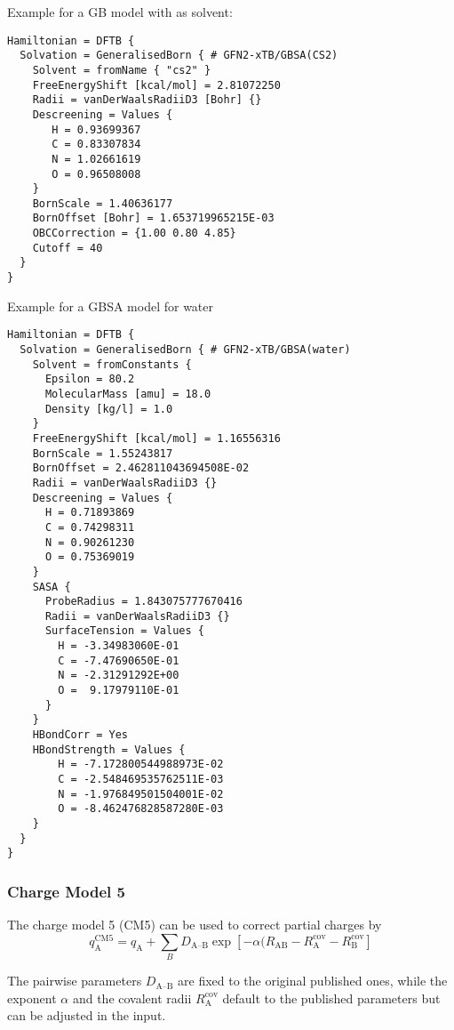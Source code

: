 Example for a GB model with  as solvent:

\begin{verbatim}
Hamiltonian = DFTB {
  Solvation = GeneralisedBorn { # GFN2-xTB/GBSA(CS2)
    Solvent = fromName { "cs2" }
    FreeEnergyShift [kcal/mol] = 2.81072250
    Radii = vanDerWaalsRadiiD3 [Bohr] {}
    Descreening = Values {
       H = 0.93699367
       C = 0.83307834
       N = 1.02661619
       O = 0.96508008
    }
    BornScale = 1.40636177
    BornOffset [Bohr] = 1.653719965215E-03
    OBCCorrection = {1.00 0.80 4.85}
    Cutoff = 40
  }
}
\end{verbatim}

Example for a GBSA model for water

\begin{verbatim}
Hamiltonian = DFTB {
  Solvation = GeneralisedBorn { # GFN2-xTB/GBSA(water)
    Solvent = fromConstants {
      Epsilon = 80.2
      MolecularMass [amu] = 18.0
      Density [kg/l] = 1.0
    }
    FreeEnergyShift [kcal/mol] = 1.16556316
    BornScale = 1.55243817
    BornOffset = 2.462811043694508E-02
    Radii = vanDerWaalsRadiiD3 {}
    Descreening = Values {
      H = 0.71893869
      C = 0.74298311
      N = 0.90261230
      O = 0.75369019
    }
    SASA {
      ProbeRadius = 1.843075777670416
      Radii = vanDerWaalsRadiiD3 {}
      SurfaceTension = Values {
        H = -3.34983060E-01
        C = -7.47690650E-01
        N = -2.31291292E+00
        O =  9.17979110E-01
      }
    }
    HBondCorr = Yes
    HBondStrength = Values {
        H = -7.172800544988973E-02
        C = -2.548469535762511E-03
        N = -1.976849501504001E-02
        O = -8.462476828587280E-03
    }
  }
}
\end{verbatim}


\subsubsection{Charge Model 5}
\label{sec:dftbp.CM5}

The charge model 5 (CM5)\cite{marenich2012} can be used to correct partial charges by
%
\begin{equation}
   q^\text{CM5}_\text{A} = q_\text{A}
   + \sum_{B} D_\text{A--B} \exp[-\alpha(R_\text{AB} - R^\text{cov}_\text{A} - R^\text{cov}_\text{B}]
\end{equation}

The pairwise parameters $D_\text{A--B}$ are fixed to the original published ones,
while the exponent $\alpha$ and the covalent radii $R^\text{cov}_\text{A}$ default
to the published parameters but can be adjusted in the input.

